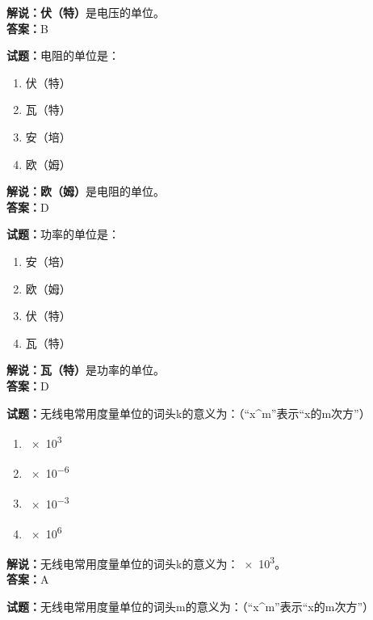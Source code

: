 \documentclass{ctexbook}
\begin{document}
\noindent\textbf{解说：伏（特）}是电压的单位。\cite[137-138]{si}\\
\noindent\textbf{答案：}B

\bigskip

\noindent\textbf{试题：}电阻的单位是：

\begin{enumerate}[leftmargin=3em]
  \item 伏（特）
  \item 瓦（特）
  \item 安（培）
  \item 欧（姆）
\end{enumerate}

\noindent\textbf{解说：欧（姆）}是电阻的单位。\cite[137-138]{si}\\
\noindent\textbf{答案：}D

\bigskip

\noindent\textbf{试题：}功率的单位是：

\begin{enumerate}[leftmargin=3em]
  \item 安（培）
  \item 欧（姆）
  \item 伏（特）
  \item 瓦（特）
\end{enumerate}

\noindent\textbf{解说：瓦（特）}是功率的单位。\cite[137-138]{si}\\
\noindent\textbf{答案：}D

\bigskip

\noindent\textbf{试题：}无线电常用度量单位的词头k的意义为：（“x\string^m”表示“x的m次方”）

\begin{enumerate}[leftmargin=3em]
  \item \num{e3}%
  \item \num{e-6}%
  \item \num{e-3}%
  \item \num{e6}%
\end{enumerate}

\noindent\textbf{解说：}无线电常用度量单位的词头k的意义为：\num{e3}。\\
\noindent\textbf{答案：}A

\bigskip

\noindent\textbf{试题：}无线电常用度量单位的词头m的意义为：（“x\string^m”表示“x的m次方”）
\end{document}
